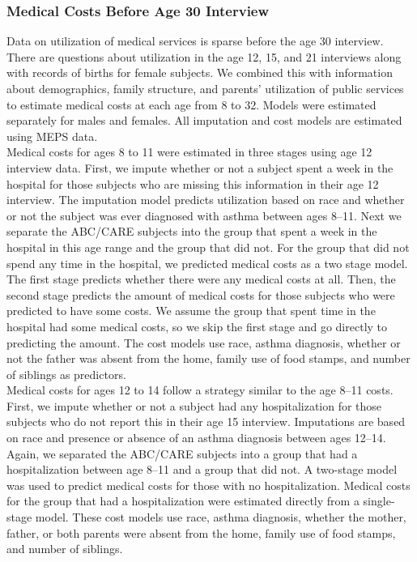\subsubsection{Medical Costs Before Age 30 Interview}

\noindent Data on utilization of medical services is sparse before the age 30 interview.  There are questions about utilization in the age 12, 15, and 21 interviews along with records of births for female subjects.  We combined this with information about demographics, family structure, and parents' utilization of public services to estimate medical costs at each age from 8 to 32.  Models were estimated separately for males and females.  All imputation and cost models are estimated using MEPS data. \\

\noindent Medical costs for ages 8 to 11 were estimated in three stages using age 12 interview data. First, we impute whether or not a subject spent a week in the hospital for those subjects who are missing this information in their age 12 interview.  The imputation model predicts utilization based on race and whether or not the subject was ever diagnosed with asthma between ages 8--11.  Next we separate the ABC/CARE subjects into the group that spent a week in the hospital in this age range and the group that did not.  For the group that did not spend any time in the hospital, we predicted medical costs as a two stage model.  The first stage predicts whether there were any medical costs at all.  Then, the second stage predicts the amount of medical costs for those subjects who were predicted to have some costs.  We assume the group that spent time in the hospital had some medical costs, so we skip the first stage and go directly to predicting the amount.  The cost models use race, asthma diagnosis, whether or not the father was absent from the home, family use of food stamps, and number of siblings as predictors.\\

\noindent Medical costs for ages 12 to 14 follow a strategy similar to the age 8--11 costs. First, we impute whether or not a subject had any hospitalization for those subjects who do not report this in their age 15 interview.  Imputations are based on race and presence or absence of an asthma diagnosis between ages 12--14.  Again, we separated the ABC/CARE subjects into a group that had a hospitalization between age 8--11 and a group that did not.  A two-stage model was used to predict medical costs for those with no hospitalization.  Medical costs for the group that had a hospitalization were estimated directly from a single-stage model.  These cost models use race, asthma diagnosis, whether the mother, father, or both parents were absent from the home, family use of food stamps, and number of siblings.\\

